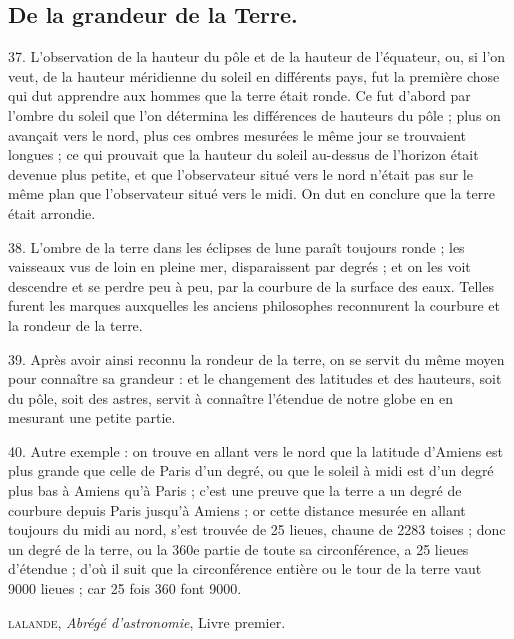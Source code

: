 \documentclass[12pt,a4paper]{article}
\begin{document}
\thispagestyle{empty}

\subsection*{De la grandeur de la Terre.}

37. L'observation de la hauteur du pôle et de la hauteur de l'équateur, ou, si l'on veut, de la hauteur méridienne du soleil en différents pays, fut la première chose qui dut apprendre aux hommes que la terre était ronde. Ce fut d'abord par l'ombre du soleil que l'on détermina les différences de hauteurs du pôle ; plus on avançait vers le nord, plus ces ombres mesurées le même jour se trouvaient longues ; ce qui prouvait que la hauteur du soleil au-dessus de l'horizon était devenue plus petite, et que l'observateur situé vers le nord n'était pas sur le même plan que l'observateur situé vers le midi. On dut en conclure que la terre était arrondie.

38. L'ombre de la terre dans les éclipses de lune paraît toujours ronde ; les vaisseaux vus de loin en pleine mer, disparaissent par degrés ; et on les voit descendre et se perdre peu à peu, par la courbure de la surface des eaux. Telles furent les marques auxquelles les anciens philosophes reconnurent la courbure et la rondeur de la terre.

39. Après avoir ainsi reconnu la rondeur de la terre, on se servit du même moyen pour connaître sa grandeur : et le changement des latitudes et des hauteurs, soit du pôle, soit des astres, servit à connaître l'étendue de notre globe en en mesurant une petite partie. \textelp{}

40. Autre exemple : on trouve en allant vers le nord que la latitude d'Amiens est plus grande que celle de Paris d'un degré, ou que le soleil à midi est d'un degré plus bas à Amiens qu'à Paris ; c'est une preuve que la terre a un degré de courbure depuis Paris jusqu'à Amiens ; or cette distance mesurée en allant toujours du midi au nord, s'est trouvée de 25 lieues, chaune de 2283 toises ; donc un degré de la terre, ou la 360e partie de toute sa circonférence, a 25 lieues d'étendue ; d'où il suit que la circonférence entière ou le tour de la terre vaut 9000 lieues ; car 25 fois 360 font 9000.

\begin{flushright}\large
\textsc{lalande}, \textit{Abrégé d'astronomie}, Livre premier.
\end{flushright}
\end{document}
